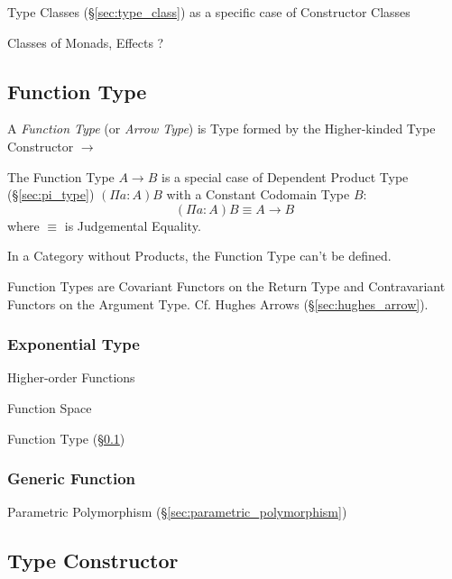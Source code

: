 Type Classes (\S\ref{sec:type_class}) as a specific case of
Constructor Classes

Classes of Monads, Effects ?



\subsection{Function Type}\label{sec:function_type}

A \emph{Function Type} (or \emph{Arrow Type}) is Type formed by the
Higher-kinded Type Constructor $\rightarrow$

The Function Type $A \rightarrow B$ is a special case of Dependent
Product Type (\S\ref{sec:pi_type}) $(\Pi a:A)B$ with a Constant
Codomain Type $B$:
\[
  (\Pi a:A)B \equiv A \rightarrow B
\]
where $\equiv$ is Judgemental Equality.

In a Category without Products, the Function Type can't be defined.

Function Types are Covariant Functors on the Return Type and
Contravariant Functors on the Argument Type. Cf. Hughes Arrows
(\S\ref{sec:hughes_arrow}).



\subsubsection{Exponential Type}\label{sec:exponential_type}

Higher-order Functions

Function Space

Function Type (\S\ref{sec:function_type})



\subsubsection{Generic Function}\label{sec:generic_function}

Parametric Polymorphism (\S\ref{sec:parametric_polymorphism})



\subsection{Type Constructor}\label{sec:type_constructor}

